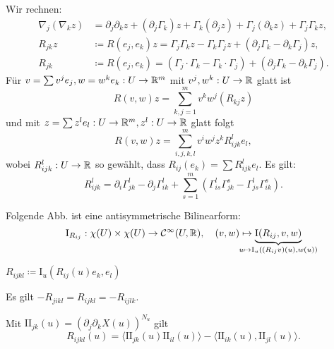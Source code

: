 \documentclass{cheat-sheet}
\newcommand{\FFI}{\mathrm{I}} %
\newcommand{\FFII}{\mathrm{I\!I}} %
\newcommand{\Cont}{\mathcal{C}} %
\begin{document}

\begin{bem}
  Wir rechnen:
  \begin{align*}
    \nabla_j (\nabla_k z) &= \partial_j \partial_k z + (\partial_j \Gamma_k) z + \Gamma_k (\partial_j z) + \Gamma_j (\partial_k z) + \Gamma_j \Gamma_k z, \\
    R_{jk} z &\coloneqq R(e_j, e_k) z = \Gamma_j \Gamma_k z - \Gamma_k \Gamma_j z + (\partial_j \Gamma_k - \partial_k \Gamma_j) z, \\
    R_{jk} &\coloneqq R(e_j, e_k) = (\Gamma_j \cdot \Gamma_k - \Gamma_k \cdot \Gamma_j) + (\partial_j \Gamma_k - \partial_k \Gamma_j).
  \end{align*}
  Für $v = \sum v^j e_j, w = w^k e_k : U \to \R^m$ mit $v^j, w^k : U \to \mathbb{R}$ glatt ist
  \[ R(v, w) z = \sum_{k,j=1}^m v^k w^j (R_{kj} z) \]
  und mit $z = \sum z^l e_l : U \to \R^m, z^l : U \to \R$ glatt folgt
  \[ R(v, w) z = \sum_{i,j,k,l}^m v^i w^j z^k R_{ijk}^l e_l, \]
  wobei $R_{ijk}^l : U \to \mathbb{R}$ so gewählt, dass $R_{ij}(e_k) = \sum R_{ijk}^l e_l$. Es gilt:
  \[ R_{ijk}^l = \partial_i \Gamma_{jk}^l - \partial_j \Gamma_{ik}^l + \sum_{s=1}^m (\Gamma_{is}^l \Gamma_{jk}^s - \Gamma_{js}^l \Gamma_{ik}^s). \]
\end{bem}


\begin{satz}
  Folgende Abb. ist eine antisymmetrische Bilinearform:
  \[
    \FFI_{R_{ij}} : \chi(U) \times \chi(U) \to \Cont^\infty(U, \R), \quad
    (v, w) \mapsto \underbrace{\FFI(R_{ij}, v, w)}_{\mathclap{u \mapsto \FFI_u((R_{ij} v)(u), w(u))}}
  \]
  \vspace{-8pt}
\end{satz}

\begin{nota}
  $R_{ijkl} \coloneqq \FFI_u(R_{ij}(u) e_k, e_l)$
\end{nota}

\begin{lem}
  Es gilt $- R_{jikl} = R_{ijkl} = - R_{ijlk}$.
\end{lem}

\begin{satz}
  Mit $\FFII_{jk}(u) = \left( \partial_j \partial_k X(u) \right)^{N_u}$ gilt
  \[ R_{ijkl}(u) = \langle \FFII_{jk} (u) \FFII_{il}(u) \rangle - \langle \FFII_{ik}(u), \FFII_{jl}(u) \rangle. \]
\end{satz}
\end{document}
